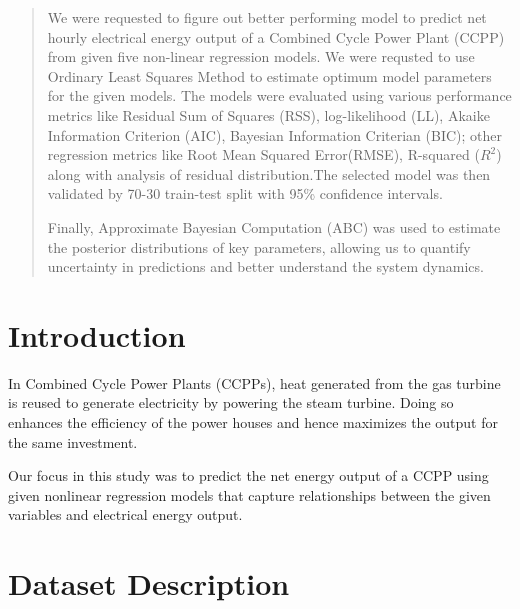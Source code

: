 \documentclass[12pt,a4paper]{article}
\begin{document}
\begin{abstract}

We were requested to figure out better performing model to predict net 
hourly electrical energy output of a Combined Cycle Power Plant (CCPP) from given
five non-linear regression models. We were requsted to use Ordinary
Least Squares Method to estimate optimum model parameters for the given models. The models were 
evaluated using various performance metrics like Residual Sum of Squares (RSS), 
log-likelihood (LL), Akaike Information Criterion (AIC), Bayesian Information Criterian (BIC); 
other regression metrics like Root Mean Squared Error(RMSE), R-squared ($R^2$) 
along with analysis of residual distribution.The selected model was then validated 
by 70-30 train-test split with 95\% confidence intervals.
 
Finally, Approximate Bayesian Computation (ABC) was used to 
estimate the posterior distributions of key parameters, allowing 
us to quantify uncertainty in predictions and better understand the system dynamics.

\end{abstract}


\section*{Introduction}

In Combined Cycle Power Plants (CCPPs), 
heat generated from the gas turbine is reused to generate electricity by powering the 
steam turbine. Doing so enhances the efficiency of the power houses and hence maximizes the output 
for the same investment.  

Our focus in this study was to predict the net energy output of a CCPP 
using given nonlinear regression models that capture relationships 
between the given variables and electrical energy output. %


\section*{Dataset Description}
\end{document}
